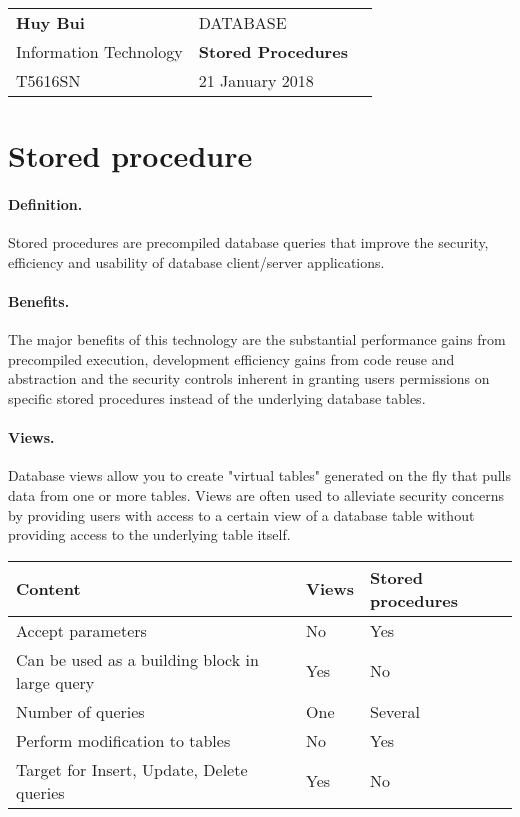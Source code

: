 \documentclass[10pt,a4paper]{article}
\author{Huy Bui}
\begin{document}
\begin{tabular}{p{8cm}ll}
	\textbf{Huy Bui}		&	\textsc{DATABASE}			\\
	Information Technology	&	\textbf{Stored Procedures}	\\
	T5616SN					&	21 January 2018				\\
\end{tabular}
\section{Stored procedure}
\paragraph{Definition.} Stored procedures are precompiled database queries that improve the security, efficiency and usability of database client/server applications.
\paragraph{Benefits.} The major benefits of this technology are the substantial performance gains from precompiled execution, development efficiency gains from code reuse and abstraction and the security controls inherent in granting users permissions on specific stored procedures instead of the underlying database tables.
\paragraph{Views.} Database views allow you to create "virtual tables" generated on the fly that pulls data from one or more tables. Views are often used to alleviate security concerns by providing users with access to a certain view of a database table without providing access to the underlying table itself.\\

\begin{tabular}{|l|l|l|}
	\hline
	\textbf{Content}	&	\textbf{Views}	&	\textbf{Stored procedures}\\
	\hline
	Accept parameters	&	No	&	Yes	\\
	\hline
	Can be used as a building block in large query	&	Yes	&	No	\\
	\hline
	Number of queries	&	One	&	Several\\
	\hline
	Perform modification to tables	&	No	&	Yes\\
	\hline
	Target for Insert, Update, Delete queries	&	Yes	&	No\\
	\hline
\end{tabular}
\end{document}
